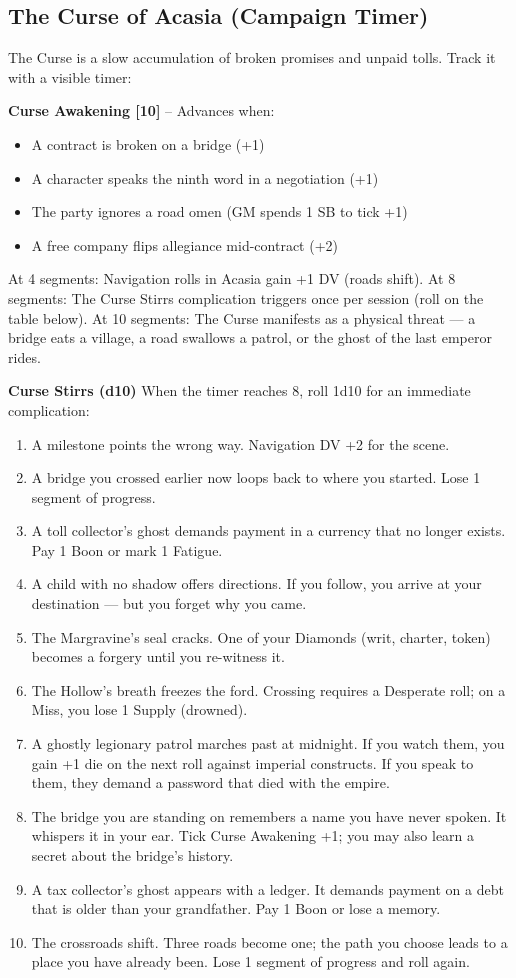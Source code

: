 \subsection*{The Curse of Acasia (Campaign Timer)}
The Curse is a slow accumulation of broken promises and unpaid tolls. Track it with a visible timer:

\textbf{Curse Awakening [10]} -- Advances when:
\begin{itemize}
\item A contract is broken on a bridge (+1)
\item A character speaks the ninth word in a negotiation (+1)
\item The party ignores a road omen (GM spends 1 SB to tick +1)
\item A free company flips allegiance mid-contract (+2)
\end{itemize}
At 4 segments: Navigation rolls in Acasia gain +1 DV (roads shift).  
At 8 segments: The Curse Stirrs complication triggers once per session (roll on the table below).  
At 10 segments: The Curse manifests as a physical threat --- a bridge eats a village, a road swallows a patrol, or the ghost of the last emperor rides.

\textbf{Curse Stirrs (d10)}  
When the timer reaches 8, roll 1d10 for an immediate complication:
\begin{enumerate}
\item A milestone points the wrong way. Navigation DV +2 for the scene.
\item A bridge you crossed earlier now loops back to where you started. Lose 1 segment of progress.
\item A toll collector's ghost demands payment in a currency that no longer exists. Pay 1 Boon or mark 1 Fatigue.
\item A child with no shadow offers directions. If you follow, you arrive at your destination --- but you forget why you came.
\item The Margravine's seal cracks. One of your Diamonds (writ, charter, token) becomes a forgery until you re-witness it.
\item The Hollow's breath freezes the ford. Crossing requires a Desperate roll; on a Miss, you lose 1 Supply (drowned).
\item A ghostly legionary patrol marches past at midnight. If you watch them, you gain +1 die on the next roll against imperial constructs. If you speak to them, they demand a password that died with the empire.
\item The bridge you are standing on remembers a name you have never spoken. It whispers it in your ear. Tick Curse Awakening +1; you may also learn a secret about the bridge's history.
\item A tax collector's ghost appears with a ledger. It demands payment on a debt that is older than your grandfather. Pay 1 Boon or lose a memory.
\item The crossroads shift. Three roads become one; the path you choose leads to a place you have already been. Lose 1 segment of progress and roll again.
\end{enumerate}

